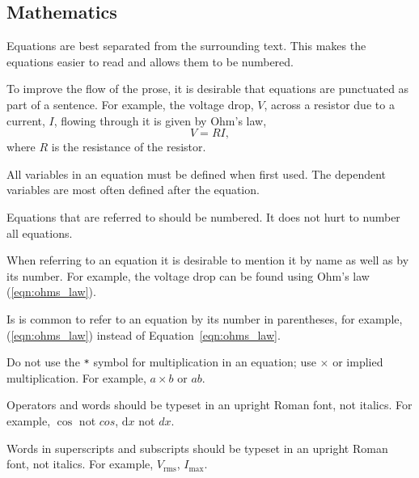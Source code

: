 \documentclass[a4paper,12pt]{article}
\newcommand{\refeqn}[1]{\mbox{(\ref{eqn:#1})}}
\newcommand{\ud}{\mathrm{d}}                    %
\newcounter{foo}
\begin{document}
\subsection{Mathematics}
\label{sec:mathematics}

\begin{list}{M-}{}
\item Equations are best separated from the surrounding text.  This
  makes the equations easier to read and allows them to be numbered.

\item To improve the flow of the prose, it is desirable that equations
  are punctuated as part of a sentence.  For example, the voltage
  drop, $V$, across a resistor due to a current, $I$, flowing through
  it is given by Ohm's law,
%
\begin{equation}
  V = R I,
\label{eqn:ohms_law}
\end{equation}
%
where $R$ is the resistance of the resistor.

\item All variables in an equation must be defined when first used.
  The dependent variables are most often defined after the equation.

\item Equations that are referred to should be numbered.  It does not
  hurt to number all equations.

\item When referring to an equation it is desirable to mention it by
  name as well as by its number.  For example, the voltage drop can be
  found using Ohm's law \refeqn{ohms_law}.

\item Is is common to refer to an equation by its number in
  parentheses, for example, \refeqn{ohms_law} instead of
  Equation~\ref{eqn:ohms_law}.

\item Do not use the \verb+*+ symbol for multiplication in an
  equation; use $\times$ or implied multiplication.  For example, $a
  \times b $ or $a b$.

\item Operators and words should be typeset in an upright Roman font,
  not italics.  For example, $\cos$ not $cos$, $\ud x$ not $d x$.

\item Words in superscripts and subscripts should be typeset in an
  upright Roman font, not italics.  For example, $V_{\mathrm{rms}}$,
$I_{\mathrm{max}}$.

\end{list}
\end{document}
